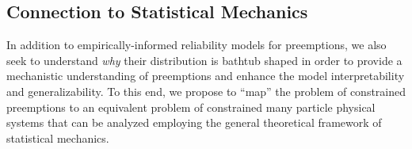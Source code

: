 



\subsection{Connection to Statistical Mechanics}

In addition to empirically-informed reliability models for preemptions, we also seek to understand \emph{why} their distribution is bathtub shaped in order to provide a mechanistic understanding of preemptions and enhance the model interpretability and generalizability. 
To this end, we propose to ``map'' the problem of constrained preemptions to an equivalent problem of constrained many particle physical systems that can be analyzed employing the general theoretical framework of statistical mechanics.



